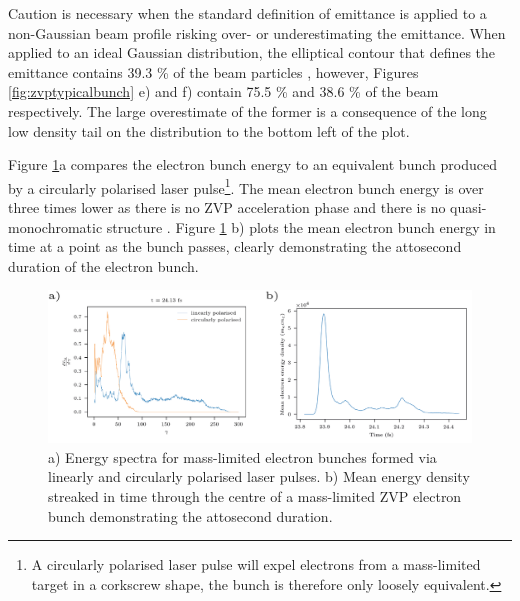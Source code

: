 Caution is necessary when the standard definition of emittance is applied to a non-Gaussian beam profile risking over- or underestimating the emittance. When applied to an ideal Gaussian distribution, the elliptical contour that defines the emittance contains 39.3 \% of the beam particles \cite{mcdonaldMethodsEmittanceMeasurement1989}, however, Figures \ref{fig:zvptypicalbunch} e) and f) contain 75.5 \% and 38.6 \% of the beam respectively. The large overestimate of the former is a consequence of the long low density tail on the distribution to the bottom left of the plot.

Figure \ref{fig:zvptypicalbunchlines}a compares the electron bunch energy to an equivalent bunch produced by a circularly polarised laser pulse\footnote{A circularly polarised laser pulse will expel electrons from a mass-limited target in a corkscrew shape, the bunch is therefore only loosely equivalent.}. The mean electron bunch energy is over three times lower as there is no ZVP acceleration phase and there is no quasi-monochromatic structure \cite{baevaZeroVectorPotential2011}. Figure \ref{fig:zvptypicalbunchlines} b) plots the mean electron bunch energy in time at a point as the bunch passes, clearly demonstrating the attosecond duration of the electron bunch.
\begin{figure}
	\centering
	\includegraphics[width=1\linewidth]{figures/zvp/zvp_typical_bunch_lines}
	\caption[Energy spectra for mass-limited electron bunches formed via linearly and circularly polarised laser pulses.]{a) Energy spectra for mass-limited electron bunches formed via linearly and circularly polarised laser pulses. b) Mean energy density streaked in time through the centre of a mass-limited ZVP electron bunch demonstrating the attosecond duration.}
	\label{fig:zvptypicalbunchlines}
\end{figure}

